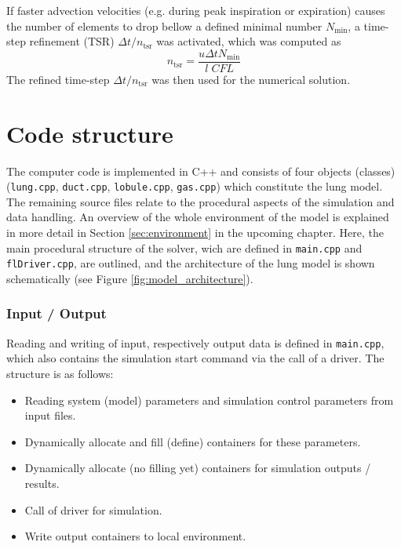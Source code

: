 If faster advection velocities (e.g. during peak inspiration or expiration) causes the number of elements to drop bellow a defined minimal number
$N_\mathrm{min}$, a time-step refinement (TSR) $\Delta t / n_\mathrm{tsr}$ was activated, which was computed as
\begin{equation}
  n_\mathrm{tsr} = \frac{u \Delta t N_\mathrm{min}}{l\;CFL}
\end{equation}
The refined time-step $\Delta t / n_\mathrm{tsr}$ was then used for the numerical solution.



\section{Code structure} \label{sec:code_structure}
The computer code is implemented in C++ and consists of four objects (classes) (\texttt{lung.cpp}, \texttt{duct.cpp}, \texttt{lobule.cpp}, \texttt{gas.cpp}) which constitute the lung model.
The remaining source files relate to the procedural aspects of the simulation and data handling.
An overview of the whole environment of the model is explained in more detail in Section \ref{sec:environment} in the upcoming chapter.
Here, the main procedural structure of the solver, wich are defined in \texttt{main.cpp} and \texttt{flDriver.cpp}, are outlined, and the architecture of the lung model is shown schematically (see Figure \ref{fig:model_architecture}).

\subsubsection{Input / Output}
Reading and writing of input, respectively output data is defined in \texttt{main.cpp}, which also contains the simulation start command via the
call of a driver.
The structure is as follows:
\begin{itemize}
  \item Reading system (model) parameters and simulation control parameters from input files.
  \item Dynamically allocate and fill (define) containers for these parameters.
  \item Dynamically allocate (no filling yet) containers for simulation outputs / results.
  \item Call of driver for simulation.
  \item Write output containers to local environment.
\end{itemize}

